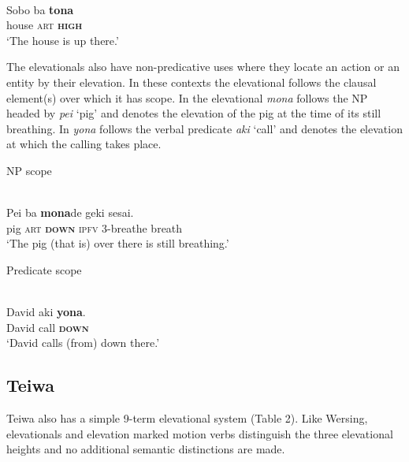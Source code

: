 \ea%
\label{ex:7:3}
 \\
\gll Sobo  ba  \textbf{{tona}}\\
        house  \textsc{art} \textbf{\textsc{high}} \\
\glt`The house is up there.' 
\z

  



   

The elevationals also have non-predicative uses where they locate an action or an entity by their elevation. In these contexts the elevational follows the clausal element(s) over which it has scope. In  the elevational \textit{mona} follows the NP headed by \textit{pei} `pig' and denotes the elevation of the pig at the time of its still breathing. In  \textit{yona} follows the verbal predicate \textit{aki} `call' and denotes the elevation at which the calling takes place.

 NP scope



\ea%
\label{ex:7:4}
 \\
\gll Pei   ba  \textbf{{mona}}{de}  geki{\ng}  sesai.\\
       pig  \textsc{art} \textbf{\textsc{down}} \textsc{ipfv} \textsc{3-}breathe  breath \\
\glt  `The pig (that is) over there is still breathing.'
\z

 

 



Predicate scope    



\ea%
\label{ex:7:5}
 \\
\gll David   aki  \textbf{{yona}}{.} \\
       David  call  \textbf{\textsc{down}} \\
\glt `David calls (from) down there.'
\z

  

 

 

\subsection{Teiwa}
Teiwa also has a simple 9-term elevational system (Table 2). Like Wersing, elevationals and elevation marked motion verbs distinguish the three elevational heights and no additional semantic distinctions are made.

